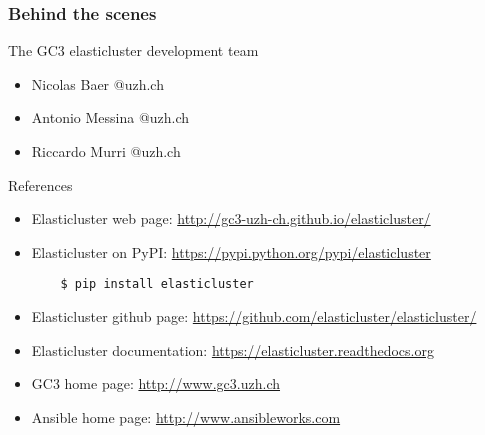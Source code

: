 \documentclass[english,serif,mathserif,usenames,dvipsnames]{beamer}
\begin{document}
\begin{frame}
  \frametitle{Behind the scenes}
  \begin{block}{The GC3 elasticluster development team}
  \begin{itemize}
    \item Nicolas Baer {@uzh.ch}
    \item Antonio Messina {@uzh.ch}
    \item Riccardo Murri {@uzh.ch}
  \end{itemize}
  \end{block}
\end{frame}

\begin{frame}[fragile]
  {References}
  \begin{itemize}
  \item Elasticluster web page: 
    \url{http://gc3-uzh-ch.github.io/elasticluster/}

    \item Elasticluster on PyPI:
      \url{https://pypi.python.org/pypi/elasticluster}
      
\begin{verbatim}
    $ pip install elasticluster
\end{verbatim}

\item Elasticluster github page: 
  \url{https://github.com/elasticluster/elasticluster/}
\item Elasticluster documentation:
    \url{https://elasticluster.readthedocs.org}
  \item GC3 home page: \url{http://www.gc3.uzh.ch}
  \item Ansible home page: \url{http://www.ansibleworks.com}
  \end{itemize}
\end{frame}

    
\end{document}
